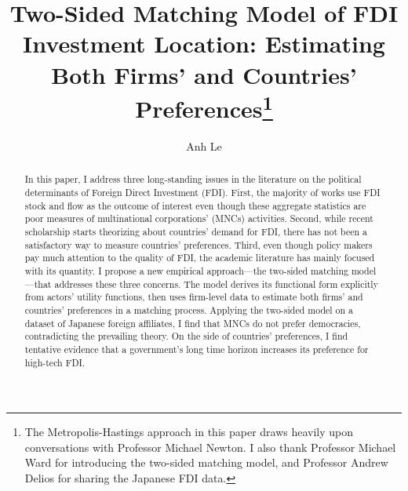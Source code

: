\documentclass[12pt]{article}
\title{Two-Sided Matching Model of FDI Investment Location: Estimating Both Firms' and Countries' Preferences\thanks{The Metropolis-Hastings approach in this paper draws heavily upon conversations with Professor Michael Newton. I also thank Professor Michael Ward for introducing the two-sided matching model, and Professor Andrew Delios for sharing the Japanese FDI data.}}
\author{Anh Le}
\begin{document}
\maketitle

\begin{abstract}
In this paper, I address three long-standing issues in the literature on the political determinants of Foreign Direct Investment (FDI). First, the majority of works use FDI stock and flow as the outcome of interest even though these aggregate statistics are poor measures of multinational corporations' (MNCs) activities. Second, while recent scholarship starts theorizing about countries' demand for FDI, there has not been a satisfactory way to measure countries' preferences. Third, even though policy makers pay much attention to the quality of FDI, the academic literature has mainly focused with its quantity. I propose a new empirical approach---the two-sided matching model---that addresses these three concerns. The model derives its functional form explicitly from actors' utility functions, then uses firm-level data to estimate both firms' and countries' preferences in a matching process. Applying the two-sided model on a dataset of Japanese foreign affiliates, I find that MNCs do not prefer democracies, contradicting the prevailing theory. On the side of countries' preferences, I find tentative evidence that a government's long time horizon increases its preference for high-tech FDI.
\end{abstract}













\newpage
\appendix



\clearpage


\end{document}
